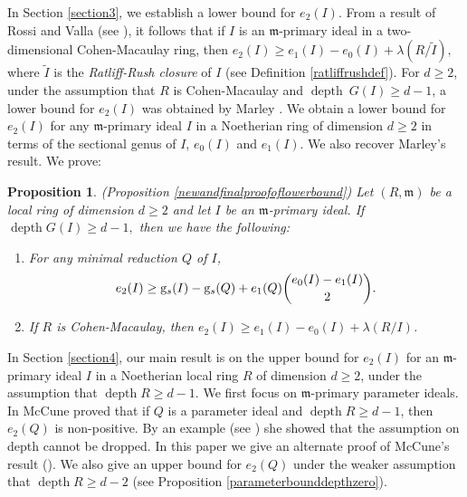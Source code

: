 \documentclass[reqno,a4paper,dvipsnames]{amsart}
\newcommand{\m}{\mathfrak{m} }
\newcommand{\depth}{\operatorname{depth}}
\newtheorem{proposition}[theorem]{Proposition}
\theoremstyle{definition}
\begin{document}
In Section \ref{section3}, we establish  a lower bound for $e_2(I).$ From a result of Rossi and Valla (see \cite[Theorem~3.1(a)]{rv}), it follows that  if $I$ is an $\m$-primary ideal in a two-dimensional Cohen-Macaulay ring, then $e_2(I) \geq e_{1
}(I)-e_{0}(I)+ \lambda(R/\widetilde{I}),$ where $\widetilde{I}$ is the \textit{Ratliff-Rush closure} of $I$ (see Definition \ref{ratliffrushdef}). For $d \ge 2$, under the assumption that $R$ is Cohen-Macaulay and $\depth ~G(I) \geq d-1$,    a lower bound for $e_2(I)$ was obtained  by Marley \cite[Corollary~2(3)]{marley}.  We obtain a lower bound for $e_2(I)$   for any $\m$-primary  ideal $I$ in a Noetherian ring  of dimension $d \ge 2$ in terms of the sectional genus of $I$, $e_0(I)$ and $e_1(I)$. We also recover Marley's result. We prove:
\begin{proposition} (Proposition \ref{newandfinalproofoflowerbound})
      Let $(R,\m)$ be a  local ring of dimension $d\geq 2$ and let $I$ be an $\m$-primary ideal.  If $\depth G(I) \geq d-1,$ then we have the following:
 \begin{enumerate} [\normalfont (i)]
     \item 
      For any minimal reduction $Q$ of $I$, 
      \begin{equation*} 
      e_{2}(I) \geq  \mathrm{g}_{s}(I)-\mathrm{g}_{s}(Q)+e_{1}(Q)\dbinom{e_{0}(I)-e_{1}(I)}{2}.
       \end{equation*}
       
              \item 
      \cite[Corollary~2 (3)]{marley}
       If $R$ is Cohen-Macaulay, then 
       $e_{2}(I)\geq e_{1}(I)-e_{0}(I)+\lambda(R/I)$.    
 \end{enumerate}
 \end{proposition}
 

In  Section \ref{section4}, our main result is on the upper bound for $e_2(I)$ for an $\m$-primary ideal $I$ in  a Noetherian local ring $R$ of dimension $d \geq 2$, under the assumption that $\depth R \geq d-1$.  We first focus on $\m$-primary parameter ideals. In \cite[Theorem 3.5]{lori} McCune  proved that if $Q$ is a parameter ideal and $\depth R \geq d-1$, then $e_2(Q)$ is non-positive. By an example (see  \cite[Example 3.7]{lori}) she showed that the assumption on depth cannot be dropped. In this paper we give an alternate proof of McCune's result (\cite[Theorem 3.5]{lori}). We also give an upper bound for $e_2(Q)$ under the weaker assumption  that $\depth R \ge d-2$ (see Proposition \ref{parameterbounddepthzero}). 
\end{document}

